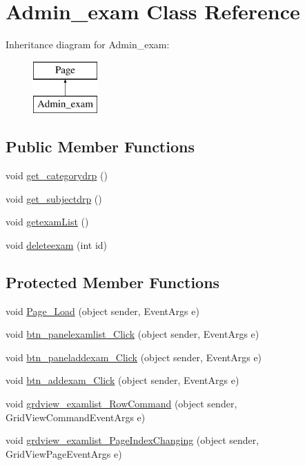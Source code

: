 \hypertarget{class_admin__exam}{}\section{Admin\+\_\+exam Class Reference}
\label{class_admin__exam}
Inheritance diagram for Admin\+\_\+exam\+:\begin{figure}[H]
\begin{center}
\leavevmode
\includegraphics[height=2.000000cm]{class_admin__exam}
\end{center}
\end{figure}
\subsection*{Public Member Functions}
\begin{DoxyCompactItemize}
\item 
void \mbox{\hyperlink{class_admin__exam_afd36c9f6e379437d3b26990dc02d1bd9}{get\+\_\+categorydrp}} ()
\item 
void \mbox{\hyperlink{class_admin__exam_a890f5ce140b9b389a51cc6b4a96eec57}{get\+\_\+subjectdrp}} ()
\item 
void \mbox{\hyperlink{class_admin__exam_a71e7385b85f3a13a988afd28d61abd4e}{getexam\+List}} ()
\item 
void \mbox{\hyperlink{class_admin__exam_a78ec6acf22d20761b883bcdb76a1c046}{deleteexam}} (int id)
\end{DoxyCompactItemize}
\subsection*{Protected Member Functions}
\begin{DoxyCompactItemize}
\item 
void \mbox{\hyperlink{class_admin__exam_a00a00feaddf0698b9b7e6b18ff9424a9}{Page\+\_\+\+Load}} (object sender, Event\+Args e)
\item 
void \mbox{\hyperlink{class_admin__exam_a53b6d4a1c770701ef00bb857f0e55dbe}{btn\+\_\+panelexamlist\+\_\+\+Click}} (object sender, Event\+Args e)
\item 
void \mbox{\hyperlink{class_admin__exam_a548c7c9052eb34ce0a0157ebf68c0bfe}{btn\+\_\+paneladdexam\+\_\+\+Click}} (object sender, Event\+Args e)
\item 
void \mbox{\hyperlink{class_admin__exam_addecc67ff48bdc0aa12b62d9957507e3}{btn\+\_\+addexam\+\_\+\+Click}} (object sender, Event\+Args e)
\item 
void \mbox{\hyperlink{class_admin__exam_aff3ef80a19bde9a35217da0953e2ccba}{grdview\+\_\+examlist\+\_\+\+Row\+Command}} (object sender, Grid\+View\+Command\+Event\+Args e)
\item 
void \mbox{\hyperlink{class_admin__exam_ad1a83687dce99d2051b3e576140d75cd}{grdview\+\_\+examlist\+\_\+\+Page\+Index\+Changing}} (object sender, Grid\+View\+Page\+Event\+Args e)
\end{DoxyCompactItemize}
